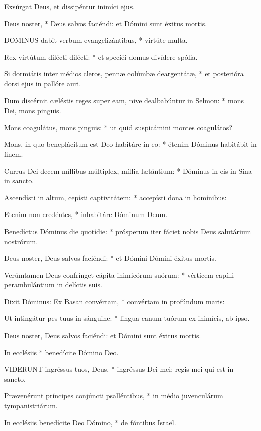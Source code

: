  Exsúrgat Deus, et dissipéntur inimíci ejus.

 Deus noster, * Deus salvos faciéndi: et Dómini sunt éxitus mortis.


\lettrine[lines=2]{D}{OMINUS} dabit verbum evangelizántibus, * virtúte multa.

Rex virtútum dilécti dilécti: * et speciéi domus divídere spólia.

Si dormiátis inter médios cleros, pennæ colúmbæ deargentátæ, * et posterióra dorsi ejus in pallóre auri.

Dum discérnit cæléstis reges super eam, nive dealbabúntur in Selmon: * mons Dei, mons pinguis.

Mons coagulátus, mons pinguis: * ut quid suspicámini montes coagulátos?

Mons, in quo beneplácitum est Deo habitáre in eo: * étenim Dóminus habitábit in finem.

Currus Dei decem míllibus múltiplex, míllia lætántium: * Dóminus in eis in Sina in sancto.

Ascendísti in altum, cepísti captivitátem: * accepísti dona in homínibus:

Etenim non credéntes, * inhabitáre Dóminum Deum.

Benedíctus Dóminus die quotídie: * prósperum iter fáciet nobis Deus salutárium nostrórum.

Deus noster, Deus salvos faciéndi: * et Dómini Dómini éxitus mortis.

Verúmtamen Deus confrínget cápita inimicórum suórum: * vérticem capílli perambulántium in delíctis suis.

Dixit Dóminus: Ex Basan convértam, * convértam in profúndum maris:

Ut intingátur pes tuus in sánguine: * lingua canum tuórum ex inimícis, ab ipso.

 Deus noster, Deus salvos faciéndi: et Dómini sunt éxitus mortis.

 In ecclésiis * benedícite Dómino Deo.


\lettrine[lines=2]{V}{IDERUNT} ingréssus tuos, Deus, * ingréssus Dei mei: regis mei qui est in sancto.

Prævenérunt príncipes conjúncti psalléntibus, * in médio juvenculárum tympanistriárum.

In ecclésiis benedícite Deo Dómino, * de fóntibus Israël.

